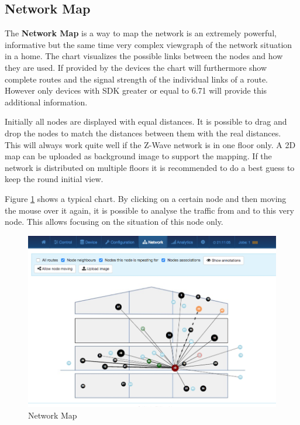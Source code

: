 \subsection{Network Map}

The \textbf{Network Map} is a way to map the network is an extremely powerful, informative but the same time very complex
viewgraph of the network situation in a home.  The chart visualizes the possible links between
the nodes and how they are used. If provided by the devices the chart will furthermore show
complete routes and the signal strength of the individual links of a route. However only 
devices with SDK greater or equal to 6.71 will provide this additional information.
 
Initially all nodes are displayed with equal distances. It is possible to drag and drop
the nodes to match the distances between them with the real distances. This will always 
work quite well if the Z-Wave network is in one floor only. 
A 2D map can be uploaded as background image to support the mapping.
If the network is distributed  on multiple floors it is recommended to do a best guess 
to keep the round initial view.

Figure \ref{c5:networkmap} shows a typical chart. By clicking on a certain node and then 
moving the mouse over it again, it is possible to analyse the traffic from and to this 
very node. This allows focusing on the situation of this node only.

\begin{figure}
\begin{center}
\includegraphics[width=1.0\textwidth]{pngs/cap7/eui24.png}
\caption {Network Map}
\label{c5:networkmap}
\end{center}
\end{figure}

